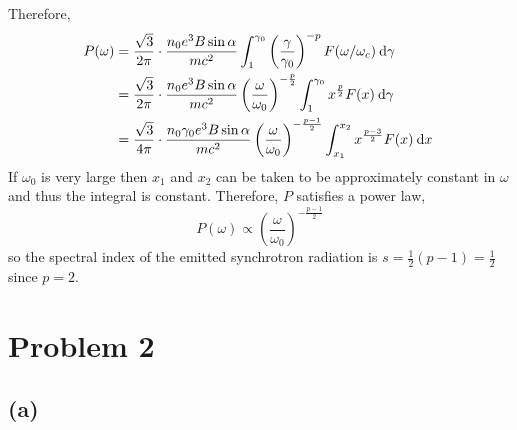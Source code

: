 \documentclass[12pt]{article}
\begin{document}
Therefore,
\begin{align*}
P(\omega) & = \frac{\sqrt{3}}{2 \pi} \cdot \frac{n_0 e^3 B \sin{\alpha}}{m c^2} \int_{1}^{\gamma_0} \left( \frac{\gamma}{\gamma_0} \right)^{-p}  F(\omega / \omega_c) \: \mathrm{d}\gamma \:  
\\
& = \frac{\sqrt{3}}{2 \pi} \cdot \frac{n_0 e^3 B \sin{\alpha}}{m c^2} \left( \frac{\omega}{\omega_0} \right)^{-\frac{p}{2}} \int_{1}^{\gamma_0} x^{\frac{p}{2}}   F(x) \: \mathrm{d}\gamma \:  
\\
& = \frac{\sqrt{3}}{4 \pi} \cdot \frac{n_0 \gamma_0 e^3 B \sin{\alpha}}{m c^2} \left( \frac{\omega}{\omega_0} \right)^{-\frac{p - 1}{2}} \int_{x_1}^{x_2} x^{\frac{p - 3}{2}}  F(x) \: \mathrm{d}x \: 
\end{align*} 
If $\omega_0$ is very large then $x_1$ and $x_2$ can be taken to be approximately constant in $\omega$ and thus the integral is constant. Therefore, $P$ satisfies a power law,
\[ P(\omega) \propto \left( \frac{\omega}{\omega_0} \right)^{-\frac{p - 1}{2}} \]
so the spectral index of the emitted synchrotron radiation is $s = \tfrac{1}{2}(p - 1) = \tfrac{1}{2}$ since $p = 2$. 


\section{Problem 2}

\subsection*{(a)}
\end{document}
